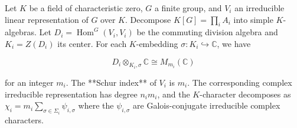 Let $K$ be a field of characteristic zero, $G$ a finite group, and $V_i$ an irreducible linear representation of $G$ over $K$. Decompose $K[G] = \prod_i A_i$ into simple $K$-algebras. Let $D_i = \operatorname{Hom}^G(V_i, V_i)$ be the commuting division algebra and $K_i = Z(D_i)$ its center. For each $K$-embedding $\sigma: K_i \hookrightarrow \mathbb{C}$, we have

$$D_i \otimes_{K_i,\sigma} \mathbb{C} \cong M_{m_i}(\mathbb{C})$$

for an integer $m_i$. The **Schur index** of $V_i$ is $m_i$. The corresponding complex irreducible representation has degree $n_i m_i$, and the $K$-character decomposes as $\chi_i = m_i \sum_{\sigma \in \Sigma_i} \psi_{i,\sigma}$ where the $\psi_{i,\sigma}$ are Galois-conjugate irreducible complex characters.
